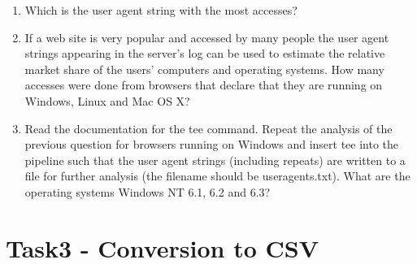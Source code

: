 \documentclass[a4paper,11pt]{article}
\begin{document}
\begin{enumerate}
  \item Which is the user agent string with the most accesses?
  \item If a web site is very popular and accessed by many people the user agent strings appearing in the server's log can be used to estimate the relative market share of the users' computers and operating systems. How many accesses were done from browsers that declare that they are running on Windows, Linux and Mac OS X?
  \item Read the documentation for the tee command. Repeat the analysis of the previous question for browsers running on Windows and insert tee into the pipeline such that the user agent strings (including repeats) are written to a file for further analysis (the filename should be useragents.txt). What are the operating systems Windows NT 6.1, 6.2 and 6.3?
\end{enumerate}


\section{Task3 - Conversion to CSV}
\end{document}
